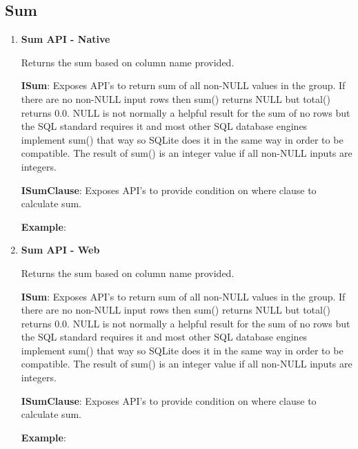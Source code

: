 		

	\subsection{Sum} 

		\begin{enumerate}

			\item \small \textbf{Sum API - Native}
				\par 
				Returns the sum based on column name provided.
					
		
				\textbf{ISum}:   Exposes API's to return sum of all non-NULL values in the group.
					  	 If there are no non-NULL input rows then sum() returns NULL but total() returns 0.0.
						 NULL is not normally a helpful result for the sum of no rows but the SQL standard requires it and most other SQL database engines implement sum() that way so SQLite does it in the same way in order to be compatible.
						 The result of sum() is an integer value if all non-NULL inputs are integers. 

					

			
				\textbf{ISumClause}: Exposes API's to provide condition on where clause to calculate sum.
					

				\textbf{Example}: 
					


			\item \small \textbf{Sum API - Web}
				\par 
				Returns the sum based on column name provided.
					
		
				\textbf{ISum}:   Exposes API's to return sum of all non-NULL values in the group.
					  	 If there are no non-NULL input rows then sum() returns NULL but total() returns 0.0.
						 NULL is not normally a helpful result for the sum of no rows but the SQL standard requires it and most other SQL database engines implement sum() that way so SQLite does it in the same way in order to be compatible.
						 The result of sum() is an integer value if all non-NULL inputs are integers. 

					

			
				\textbf{ISumClause}: Exposes API's to provide condition on where clause to calculate sum.
					

				\textbf{Example}: 
					

		\end{enumerate}


